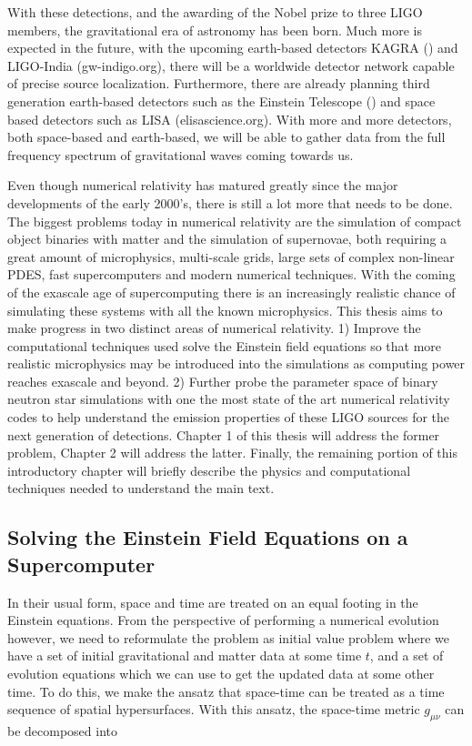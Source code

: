 With these detections, and the awarding of the Nobel prize to three LIGO members, the gravitational era of astronomy has been born. Much more is expected in the future, with the upcoming earth-based detectors KAGRA (\cite{somiya2012detector}) and LIGO-India (gw-indigo.org), there will be a worldwide detector network capable of precise source localization. Furthermore, there are already planning third generation earth-based detectors such as the Einstein Telescope (\cite{einsteintelescope}) and space based detectors such as LISA (elisascience.org). With more and more detectors, both space-based and earth-based, we will be able to gather data from the full frequency spectrum of gravitational waves coming towards us.

Even though numerical relativity has matured greatly since the major developments of the early 2000's, there is still a lot more that needs to be done. The biggest problems today in numerical relativity are the simulation of compact object binaries with matter and the simulation of supernovae, both requiring a great amount of microphysics, multi-scale grids, large sets of complex non-linear PDES, fast supercomputers and modern numerical techniques. With the coming of the exascale age of supercomputing there is an increasingly realistic chance of simulating these systems with all the known microphysics. This thesis aims to make progress in two distinct areas of numerical relativity. 1) Improve the computational techniques used solve the Einstein field equations so that more realistic microphysics may be introduced into the simulations as computing power reaches exascale and beyond. 2) Further probe the parameter space of binary neutron star simulations with one the most state of the art numerical relativity codes to help understand the emission properties of these LIGO sources for the next generation of detections. Chapter 1 of this thesis will address the former problem, Chapter 2 will address the latter. Finally, the remaining portion of this introductory chapter will briefly describe the physics and computational techniques needed to understand the main text. 

\subsection{Solving the Einstein Field Equations on a Supercomputer}

In their usual form, space and time are treated on an equal footing in the Einstein equations. From the perspective of performing a numerical evolution however, we need to reformulate the problem as initial value problem where we have a set of initial gravitational and matter data at some time $t$, and a set of evolution equations which we can use to get the updated data at some other time. To do this, we make the ansatz that space-time can be treated as a time sequence of spatial hypersurfaces. With this ansatz, the space-time metric $g_{\mu\nu}$ can be decomposed into

